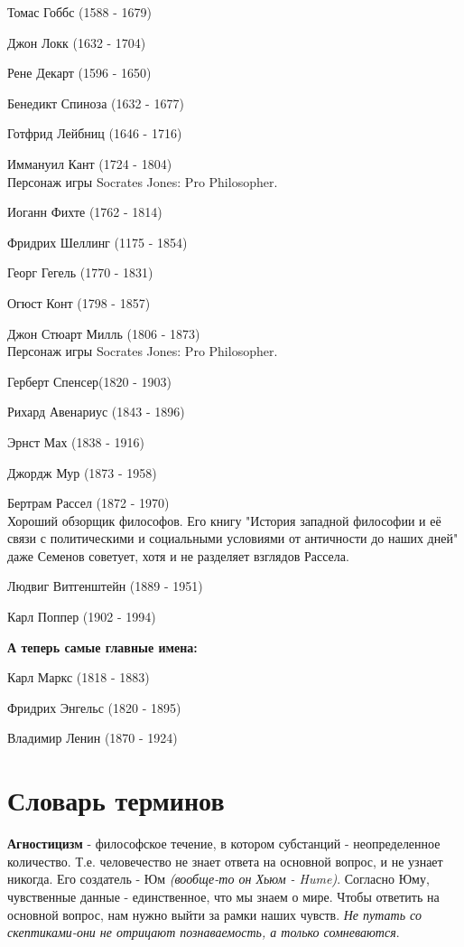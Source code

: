 \documentclass[12pt,a4paper]{article}
\begin{document}
Томас Гоббс (1588 - 1679)

Джон Локк (1632 - 1704)

Рене Декарт (1596 - 1650)

Бенедикт Спиноза (1632 - 1677)

Готфрид Лейбниц (1646 - 1716)

Иммануил Кант (1724 - 1804)\\
Персонаж игры Socrates Jones: Pro Philosopher.

Иоганн Фихте (1762 - 1814)

Фридрих Шеллинг (1175 - 1854)

Георг Гегель (1770 - 1831)

Огюст Конт (1798 - 1857)

Джон Стюарт Милль (1806 - 1873)\\
Персонаж игры Socrates Jones: Pro Philosopher.

Герберт Спенсер(1820 - 1903)

Рихард Авенариус (1843 - 1896)

Эрнст Мах (1838 - 1916)

Джордж Мур (1873 - 1958)

Бертрам Рассел (1872 - 1970)\\
Хороший обзорщик философов. Его книгу "История западной философии и её связи с политическими и социальными условиями от античности до наших дней" даже Семенов советует, хотя и не разделяет взглядов Рассела.

Людвиг Витгенштейн (1889 - 1951)

Карл Поппер (1902 - 1994)

\textbf{А теперь самые главные имена:}

Карл Маркс (1818 - 1883)

Фридрих Энгельс (1820 - 1895)

Владимир Ленин (1870 - 1924)


\section{Словарь терминов}
\textbf{Агностицизм} - философское течение, в котором субстанций - неопределенное количество. Т.е. человечество не знает ответа на основной вопрос, и не узнает никогда. Его создатель - Юм \textit{(вообще-то он Хьюм - Hume)}. Согласно Юму, чувственные данные - единственное, что мы знаем о мире. Чтобы ответить на основной вопрос, нам нужно выйти за рамки наших чувств. \textit{Не путать со скептиками-они не отрицают познаваемость, а только сомневаются}.
\end{document}
